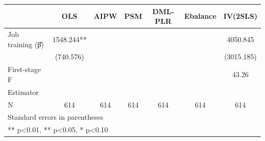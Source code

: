 \begin{table}[htbp]
\centering
\begin{tabular}{lcccccc}
\hline\hline
 & OLS & AIPW & PSM & DML-PLR & Ebalance & IV(2SLS) \\
\hline
Job training (β̂) & 1548.244** &  &  &  &  & 4050.845 \\
 & (740.576) &  &  &  &  & (3015.185) \\
\hline
First-stage F &  &  &  &  &  & 43.26 \\
\hline
Estimator &  &  &  &  &  &  \\
N & 614 & 614 & 614 & 614 & 614 & 614 \\
\hline\hline
\multicolumn{7}{l}{\footnotesize Standard errors in parentheses} \\
\multicolumn{7}{l}{\footnotesize *** p<0.01, ** p<0.05, * p<0.10} \\
\end{tabular}
\end{table}